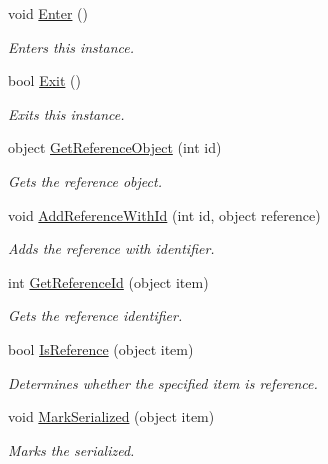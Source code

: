 \begin{DoxyCompactItemize}
\item 
void \hyperlink{class_full_serializer_1_1_internal_1_1fs_cyclic_reference_manager_a098112209466ccdf11e61c8f81f8b0e5}{Enter} ()
\begin{DoxyCompactList}\small\item\em Enters this instance. \end{DoxyCompactList}\item 
bool \hyperlink{class_full_serializer_1_1_internal_1_1fs_cyclic_reference_manager_ad9a0ff84732df338936a032c568bc182}{Exit} ()
\begin{DoxyCompactList}\small\item\em Exits this instance. \end{DoxyCompactList}\item 
object \hyperlink{class_full_serializer_1_1_internal_1_1fs_cyclic_reference_manager_a772758af872d1c63827878d587389dda}{Get\+Reference\+Object} (int id)
\begin{DoxyCompactList}\small\item\em Gets the reference object. \end{DoxyCompactList}\item 
void \hyperlink{class_full_serializer_1_1_internal_1_1fs_cyclic_reference_manager_aa27a4abcf40a5523a564a6db7cbccd5d}{Add\+Reference\+With\+Id} (int id, object reference)
\begin{DoxyCompactList}\small\item\em Adds the reference with identifier. \end{DoxyCompactList}\item 
int \hyperlink{class_full_serializer_1_1_internal_1_1fs_cyclic_reference_manager_a2bc5dca49f4803c94ae2865891652fbb}{Get\+Reference\+Id} (object item)
\begin{DoxyCompactList}\small\item\em Gets the reference identifier. \end{DoxyCompactList}\item 
bool \hyperlink{class_full_serializer_1_1_internal_1_1fs_cyclic_reference_manager_a6b65d1c5f70cf7b2c3ed5602e1173c88}{Is\+Reference} (object item)
\begin{DoxyCompactList}\small\item\em Determines whether the specified item is reference. \end{DoxyCompactList}\item 
void \hyperlink{class_full_serializer_1_1_internal_1_1fs_cyclic_reference_manager_a3dc671b9811d57d107fbd567b6d2a957}{Mark\+Serialized} (object item)
\begin{DoxyCompactList}\small\item\em Marks the serialized. \end{DoxyCompactList}\end{DoxyCompactItemize}


